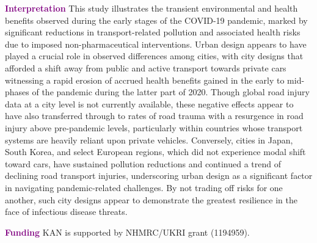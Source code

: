 \documentclass[preprint,12pt]{elsarticle}
\newcommand{\absdiv}[1]{%
  \par\addvspace{.5\baselineskip}%
  \noindent\textbf{#1}\quad\ignorespaces}
\begin{document}
 \absdiv{\textcolor{purple}{Interpretation}}
This study illustrates the transient environmental and health benefits observed during the early stages of the COVID-19 pandemic, marked by significant reductions in transport-related pollution and associated health risks due to imposed non-pharmaceutical interventions. Urban design appears to have played a crucial role in observed differences among cities, with city designs that afforded a shift away from public and active transport towards private cars witnessing a rapid erosion of accrued health benefits gained in the early to mid-phases of the pandemic during the latter part of 2020. Though global road injury data at a city level is not currently available, these negative effects appear to have also transferred through to rates of road trauma with a resurgence in road injury above pre-pandemic levels, particularly within countries whose transport systems are heavily reliant upon private vehicles. Conversely, cities in Japan, South Korea, and select European regions, which did not experience modal shift toward cars, have sustained pollution reductions and continued a trend of declining road transport injuries, underscoring urban design as a significant factor in navigating pandemic-related challenges. By not trading off risks for one another, such city designs appear to demonstrate the greatest resilience in the face of infectious disease threats. 
 \absdiv{\textcolor{purple}{Funding}}
 KAN is supported by NHMRC/UKRI grant (1194959).


\end{document}
